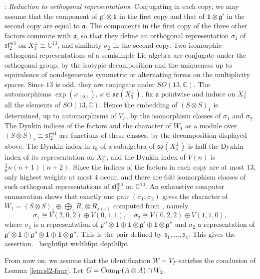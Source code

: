 \documentclass[leqno]{article}
\newcommand{\Cbb}{\ensuremath{\mathbb{C}}}
\let\cal\relax
\newcommand{\cal}{\mathcal}
\newcommand{\qed}{\hfill \vrule height6pt  width6pt depth0pt}
\newcommand{\ot}{\otimes}
\newenvironment{proof}[1][]{\noindent {\it Proof #1} : }{\hbox{~}\qed
\smallskip
}
\numberwithin{equation}{section}
\begin{document}
\begin{proof}
\emph{Reduction to orthogonal representations.} Conjugating in each copy, we may assume that the component of $\mathfrak g' \ot \mathbf 1$ in the first copy and that of $\mathbf 1 \ot \mathfrak g'$ in the second copy are equal to $\mathfrak a$. The components in the first copy of the three other factors commute with $\mathfrak a$, so that they define an orthogonal representation $\sigma_1$ of $\mathfrak{sl}_2^{\oplus 3}$ on $X_3^\perp \cong \Cbb^{13}$, and similarly $\sigma_2$ in the second copy. Two isomorphic orthogonal representations of a semisimple Lie algebra are conjugate under the orthogonal group, by the isotypic decomposition and the uniqueness up to equivalence of nondegenerate symmetric or alternating forms on the multiplicity spaces. Since $13$ is odd, they are conjugate under $SO(13,\Cbb)$. The automorphisms $\exp(x_{(0)})$, $x \in \mathfrak{so}(X_3^\perp)$, fix $\mathfrak a$ pointwise and induce on $X_3^\perp$ all the elements of $SO(13,\Cbb)$. Hence the embedding of $(S \ot S)_1$ is determined, up to automorphisms of $V_\Gamma$, by the isomorphism classes of $\sigma_1$ and $\sigma_2$. The Dynkin indices of the factors and the character of $W_1$ as a module over $(S \ot S)_1 \cong \mathfrak{sl}_2^{\oplus 4}$ are functions of these classes, by the decomposition displayed above. The Dynkin index in $\mathfrak e_8$ of a subalgebra of $\mathfrak{so}(X_3^\perp)$ is half the Dynkin index of its representation on $X_3^\perp$, and the Dynkin index of $V(n)$ is $\frac16n(n+1)(n+2)$. Since the indices of the factors in each copy are at most $13$, only highest weights at most $4$ occur, and there are $640$ isomorphism classes of such orthogonal representations of $\mathfrak{sl}_2^{\oplus 3}$ on $\Cbb^{13}$. An exhaustive computer enumeration shows that exactly one pair $(\sigma_1,\sigma_2)$ gives the character of $W_1 = (S \ot S)_1 \oplus \bigoplus_z R_z \ot R_{\pi(z)}$ computed from \cite[Table 2]{Arh26}, namely
\[
\sigma_1 \cong V(2,0,2) \oplus V(0,1,1),\quad \sigma_2 \cong V(0,2,2) \oplus V(1,1,0),
\]
where $\sigma_1$ is a representation of $\mathfrak g'' \ot \mathbf 1 \oplus \mathbf 1 \ot \mathfrak g' \oplus \mathbf 1 \ot \mathfrak g''$ and $\sigma_2$ a representation of $\mathfrak g' \ot \mathbf 1 \oplus \mathfrak g'' \ot \mathbf 1 \oplus \mathbf 1 \ot \mathfrak g''$. This is the pair defined by $\mathfrak s_1, \ldots, \mathfrak s_4$. This gives the assertion.
\end{proof}

From now on, we assume that the identification $W = V_\Gamma$ satisfies the conclusion of Lemma \ref{lem:sl2-four}. Let $\cal G = \operatorname{Com}_W(A \ot A) \cap W_2$.
\end{document}
